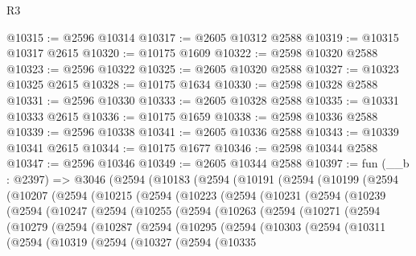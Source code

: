 \begin{lexlean}{R3}
\begin{coremodule}
@10315 := @2596 @10314
@10317 := @2605 @10312 @2588
@10319 := @10315 @10317 @2615
@10320 := @10175 @1609
@10322 := @2598 @10320 @2588
@10323 := @2596 @10322
@10325 := @2605 @10320 @2588
@10327 := @10323 @10325 @2615
@10328 := @10175 @1634
@10330 := @2598 @10328 @2588
@10331 := @2596 @10330
@10333 := @2605 @10328 @2588
@10335 := @10331 @10333 @2615
@10336 := @10175 @1659
@10338 := @2598 @10336 @2588
@10339 := @2596 @10338
@10341 := @2605 @10336 @2588
@10343 := @10339 @10341 @2615
@10344 := @10175 @1677
@10346 := @2598 @10344 @2588
@10347 := @2596 @10346
@10349 := @2605 @10344 @2588
@10397 := fun (__b : @2397) =>
  @3046
    (@2594
      (@10183
        (@2594
          (@10191
            (@2594
              (@10199
                (@2594
                  (@10207
                    (@2594
                      (@10215
                        (@2594
                          (@10223
                            (@2594
                              (@10231
                                (@2594
                                  (@10239
                                    (@2594
                                      (@10247
                                        (@2594
                                          (@10255
                                            (@2594
                                              (@10263
                                                (@2594
                                                  (@10271
                                                    (@2594
                                                      (@10279
                                                        (@2594
                                                          (@10287
                                                            (@2594
                                                              (@10295
                                                                (@2594
                                                                  (@10303
                                                                    (@2594
                                                                      (@10311
                                                                        (@2594
                                                                          (@10319
                                                                            (@2594
                                                                              (@10327
                                                                                (@2594
                                                                                  (@10335

\end{coremodule}
\end{lexlean}
